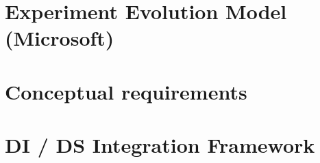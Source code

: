 \section{Experiment Evolution Model (Microsoft)}

\section{Conceptual requirements}
\section{DI / DS Integration Framework}
